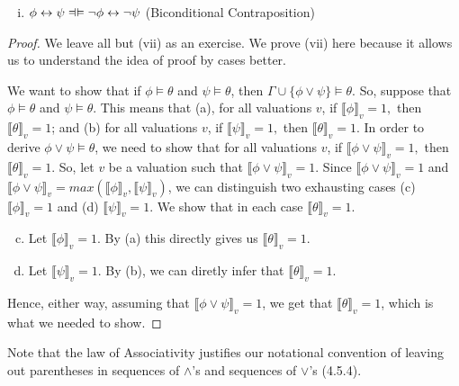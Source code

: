 \begin{enumerate}[\thesection.1]
\begin{lemma}
\begin{enumerate}[(i)]
				\item $\phi\leftrightarrow\psi\equi \neg\phi\leftrightarrow\neg\psi$ \hfill (Biconditional Contraposition)
			
			\end{enumerate}
		
		\end{lemma}
		\begin{proof}
		We leave all but (vii) as an exercise. We prove (vii) here because it allows us to understand the idea of proof by cases better. 
		
		We want to show that if $\phi\vDash\theta$ and $\psi\vDash\theta$, then $\Gamma\cup\{\phi\lor\psi\}\vDash\theta$. So, suppose that $\phi\vDash\theta$ and $\psi\vDash\theta$. This means that (a), for all valuations $v$, if $\llbracket \phi\rrbracket_v=1,$ then $\llbracket\theta\rrbracket_v=1$; and (b) for all valuations $v$, if $\llbracket \psi\rrbracket_v=1,$ then $\llbracket\theta\rrbracket_v=1$.	In order to derive $\phi\lor\psi\vDash\theta$, we need to show that for all valuations $v$, if $\llbracket \phi\lor\psi\rrbracket_v=1,$ then $\llbracket\theta\rrbracket_v=1$. So, let $v$ be a valuation such that $\llbracket \phi\lor\psi\rrbracket_v=1$. Since $\llbracket \phi\lor\psi\rrbracket_v=1$ and $\llbracket \phi\lor\psi\rrbracket_v=max(\llbracket \phi\rrbracket_v,\llbracket \psi\rrbracket_v)$, we can distinguish two exhausting cases (c) $\llbracket \phi\rrbracket_v=1$ and (d) $\llbracket \psi\rrbracket_v=1$. We show that in each case $\llbracket\theta\rrbracket_v=1$.
		\begin{enumerate}[(a)]
		\setcounter{enumii}{2}
			\item Let $\llbracket \phi\rrbracket_v=1$. By (a) this directly  gives us $\llbracket\theta\rrbracket_v=1$.
			
			\item Let $\llbracket \psi\rrbracket_v=1$. By (b), we can diretly infer that $\llbracket\theta\rrbracket_v=1$.
		
		\end{enumerate}
		Hence, either way, assuming that $\llbracket \phi\lor\psi\rrbracket_v=1$, we get that $\llbracket\theta\rrbracket_v=1$, which is what we needed to show.
				
		\end{proof}
		
		Note that the law of Associativity justifies our notational convention of leaving out parentheses in sequences of $\land$'s and sequences of $\lor$'s (4.5.4).
		

\end{enumerate}
